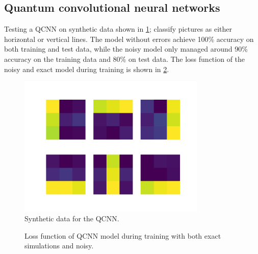 \subsection{Quantum convolutional neural networks}
Testing a QCNN on synthetic data shown in \cref{fig:qcnn_data}; classify pictures as either horizontal or vertical lines. The model without errors achieve 100\% accuracy on both training and test data, while the noisy model only managed around 90\% accuracy on the training data and 80\% on test data. The loss function of the noisy and exact model during training is shown in \cref{fig:qcnn_loss}.


\begin{figure}
    \centering
    \includegraphics[width=0.8\textwidth]{../code/qcnn/data.pdf}
    \caption{Synthetic data for the QCNN.}
    \label{fig:qcnn_data}
\end{figure}


\begin{figure}
    \centering
    \caption{Loss function of QCNN model during training with both exact simulations and noisy.}
    \label{fig:qcnn_loss}
\end{figure}


